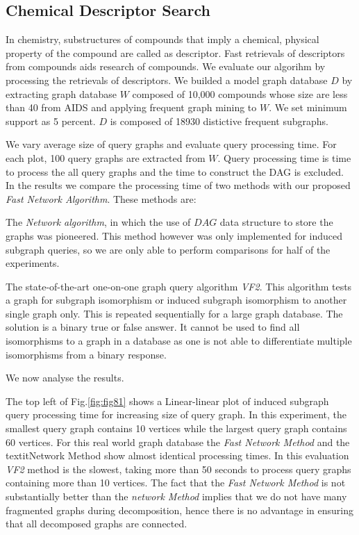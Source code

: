 \subsection{Chemical Descriptor Search}
In chemistry, substructures of compounds that imply a chemical, physical property of the compound are called as descriptor.
Fast retrievals of descriptors from compounds aids research of compounds.
We evaluate our algorihm by processing the retrievals of descriptors.
We builded a model graph database $D$ by extracting graph database $W$ composed of 10,000 compounds whose size are less than 40 from AIDS and applying frequent graph mining to $W$.
We set minimum support as 5 percent.
$D$ is composed of 18930 distictive frequent subgraphs.

We vary average size of query graphs and evaluate query processing time.
For each plot, 100 query graphs are extracted from $W$.
Query processing time is time to process the all query graphs and the time to construct the DAG is excluded. In the results we compare the processing time of two methods with our proposed \textit{Fast Network Algorithm}. These methods are: 

The \textit{Network algorithm}, in which the use of $DAG$ data structure to store the graphs was pioneered. This method however was only implemented for induced subgraph queries, so we are only able to perform comparisons for half of the experiments. 

The state-of-the-art one-on-one graph query algorithm \textit{VF2}. This algorithm  tests a graph for subgraph isomorphism or induced subgraph isomorphism to another single graph only. This is repeated sequentially for a large graph database. The solution is a binary true or false answer. It cannot be used to find all isomorphisms to a graph in a database as one is not able to differentiate multiple isomorphisms from a binary response.

We now analyse the results.

The  top left of Fig.\ref{fig:fig81} shows a Linear-linear plot of induced subgraph query processing time for increasing size of query graph. In this experiment, the smallest query graph contains 10 vertices while the largest query graph contains 60 vertices. For this real world graph database the \textit{Fast Network Method} and the textit{Network Method} show almost identical processing times. In this evaluation \textit{VF2} method is the slowest, taking more than 50 seconds to process query graphs containing more than 10 vertices. The fact that the \textit{Fast Network Method} is not substantially better than the \textit{network Method} implies that we do not have many fragmented graphs during decomposition, hence there is no advantage in ensuring that all decomposed graphs are connected.  

